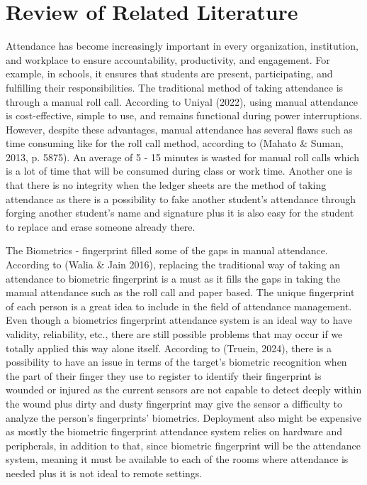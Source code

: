 \chapter{Review of Related Literature}
\label{sec:relatedlit}

Attendance has become increasingly important in every organization, institution, and workplace to ensure accountability, productivity, and engagement. For example, in schools, it ensures that students are present, participating, and fulfilling their responsibilities. The traditional method of taking attendance is through a manual roll call. According to Uniyal (2022), using manual attendance is cost-effective, simple to use, and remains functional during power interruptions. However, despite these advantages, manual attendance has several flaws such as time consuming like for the roll call method, according to (Mahato \& Suman, 2013, p. 5875). An average of 5 - 15 minutes is wasted for manual roll calls which is a lot of time that will be consumed during class or work time. Another one is that there is no integrity when the ledger sheets are the method of taking attendance as there is a possibility to fake another student’s attendance through forging another student’s name and signature plus it is also easy for the student to replace and erase someone already there. 

The Biometrics - fingerprint filled some of the gaps in manual attendance. According to (Walia \& Jain 2016), replacing the traditional way of taking an attendance to biometric fingerprint is a must as it fills the gaps in taking the manual attendance such as the roll call and paper based. The unique fingerprint of each person is a great idea to include in the field of attendance management. Even though a biometrics fingerprint attendance system is an ideal way to have validity, reliability, etc., there are still possible problems that may occur if we totally applied this way alone itself. According to (Truein, 2024), there is a possibility to have an issue in terms of the target’s biometric recognition when the part of their finger they use to register to identify their fingerprint is wounded or injured as the current sensors are not capable to detect deeply within the wound plus dirty and dusty fingerprint may give the sensor a difficulty to analyze the person’s fingerprints’ biometrics. Deployment also might be expensive as mostly the biometric fingerprint attendance system relies on hardware and peripherals, in addition to that, since biometric fingerprint will be the attendance system, meaning it must be available to each of the rooms where attendance is needed plus it is not ideal to remote settings.

